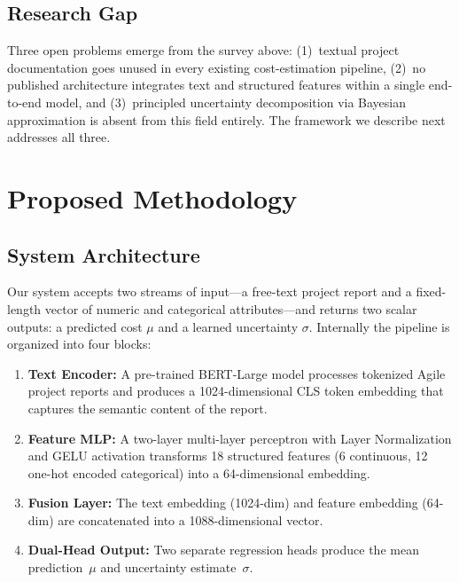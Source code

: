 \documentclass[conference]{IEEEtran}
\begin{document}
\subsection{Research Gap}

Three open problems emerge from the survey above: (1)~textual project documentation goes unused in every existing cost-estimation pipeline, (2)~no published architecture integrates text and structured features within a single end-to-end model, and (3)~principled uncertainty decomposition via Bayesian approximation is absent from this field entirely. The framework we describe next addresses all three.

\section{Proposed Methodology}

\subsection{System Architecture}

Our system accepts two streams of input---a free-text project report and a fixed-length vector of numeric and categorical attributes---and returns two scalar outputs: a predicted cost $\mu$ and a learned uncertainty $\sigma$. Internally the pipeline is organized into four blocks:

\begin{enumerate}
    \item \textbf{Text Encoder:} A pre-trained BERT-Large model \cite{devlin2019} processes tokenized Agile project reports and produces a 1024-dimensional CLS token embedding that captures the semantic content of the report.
    \item \textbf{Feature MLP:} A two-layer multi-layer perceptron with Layer Normalization and GELU activation transforms 18 structured features (6 continuous, 12 one-hot encoded categorical) into a 64-dimensional embedding.
    \item \textbf{Fusion Layer:} The text embedding (1024-dim) and feature embedding (64-dim) are concatenated into a 1088-dimensional vector.
    \item \textbf{Dual-Head Output:} Two separate regression heads produce the mean prediction~$\mu$ and uncertainty estimate~$\sigma$.
\end{enumerate}
\end{document}
